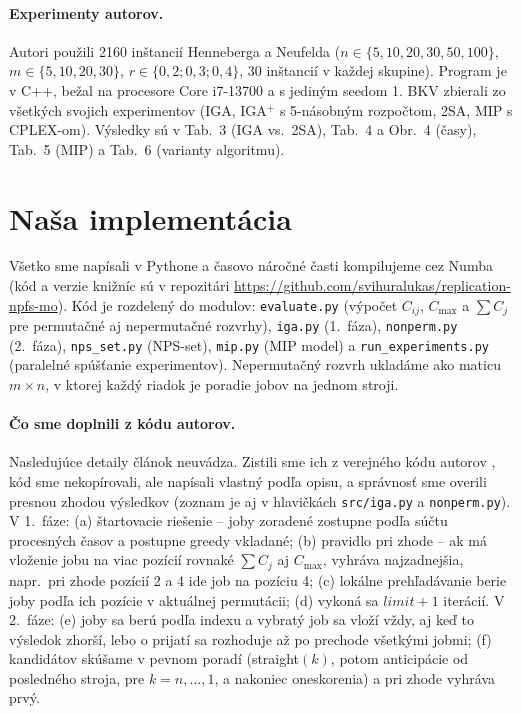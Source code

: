 \documentclass[11pt,a4paper]{article}
\newcommand{\Csum}{\sum C_j}
\begin{document}
\paragraph{Experimenty autorov.} Autori použili 2160 inštancií Henneberga a Neufelda
\cite{HennebergNeufeld2016} ($n\in\{5,10,20,30,50,100\}$, $m\in\{5,10,20,30\}$,
$r\in\{0{,}2;0{,}3;0{,}4\}$, 30 inštancií v každej skupine). Program je v C++, bežal na
procesore Core i7-13700 a s jediným seedom 1. BKV zbierali zo všetkých svojich experimentov
(IGA, IGA$^+$ s 5-násobným rozpočtom, 2SA, MIP s CPLEX-om). Výsledky sú v Tab.~3 (IGA vs.\ 2SA),
Tab.~4 a Obr.~4 (časy), Tab.~5 (MIP) a Tab.~6 (varianty algoritmu).

\section{Naša implementácia}\label{sec:impl}

\begin{sloppypar}
Všetko sme napísali v Pythone a časovo náročné časti kompilujeme cez Numba \cite{Lam2015}
(kód a verzie knižníc sú v repozitári \url{https://github.com/svihuralukas/replication-npfs-mo}). Kód je rozdelený do modulov: \texttt{evaluate.py}
(výpočet $C_{ij}$, $C_{\max}$ a $\Csum$ pre permutačné aj nepermutačné rozvrhy), \texttt{iga.py}
(1.~fáza), \texttt{nonperm.py} (2.~fáza), \texttt{nps\_set.py} (NPS-set), \texttt{mip.py} (MIP
model) a \texttt{run\_experiments.py} (paralelné spúšťanie experimentov). Nepermutačný rozvrh
ukladáme ako maticu $m\times n$, v ktorej každý riadok je poradie jobov na jednom stroji.
\end{sloppypar}

\paragraph{Čo sme doplnili z kódu autorov.} Nasledujúce detaily článok neuvádza. Zistili sme
ich z verejného kódu autorov \cite{RittRossit2024code}, kód sme nekopírovali, ale napísali
vlastný podľa opisu, a správnosť sme overili presnou zhodou výsledkov (zoznam je aj v hlavičkách
\texttt{src/iga.py} a \texttt{nonperm.py}). V 1.~fáze: (a) štartovacie
riešenie -- joby zoradené zostupne podľa súčtu procesných časov a postupne greedy vkladané;
(b) pravidlo pri zhode -- ak má vloženie jobu na viac pozícií rovnaké $\Csum$ aj $C_{\max}$,
vyhráva najzadnejšia, napr.\ pri zhode pozícií 2 a 4 ide job na pozíciu 4;
(c) lokálne prehľadávanie berie joby podľa ich pozície v aktuálnej permutácii;
(d) vykoná sa $\mathit{limit}+1$ iterácií. V 2.~fáze: (e) joby sa berú podľa indexu a vybratý
job sa vloží vždy, aj keď to výsledok zhorší, lebo o prijatí sa rozhoduje až po prechode
všetkými jobmi; (f) kandidátov skúšame v pevnom poradí (straight$(k)$, potom anticipácie od
posledného stroja, pre $k=n,\dots,1$, a nakoniec oneskorenia) a pri zhode vyhráva prvý.
\end{document}

